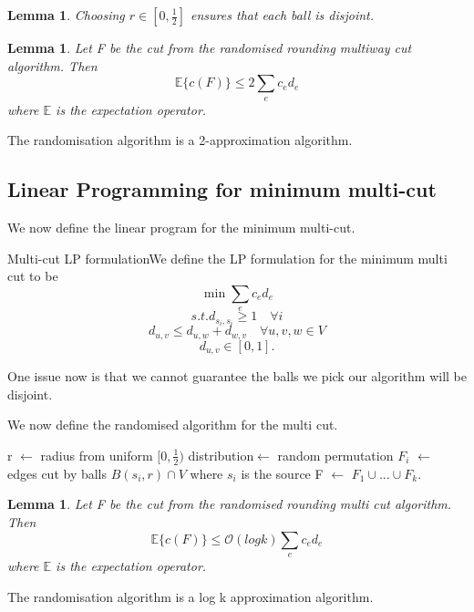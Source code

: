 \documentclass[twoside]{article}
\newtheorem{lemma}[theorem]{Lemma}
\begin{document}
\begin{lemma}Choosing $r \in [0,\frac{1}{2}]$ ensures that each ball is disjoint.
\end{lemma}

\begin{lemma}Let F be the cut from the randomised rounding multiway cut algorithm. Then 
$$
\mathbb{E}\bigg\{c(F) \bigg\} \leq 2\sum_{e}c_ed_e
$$
where $\mathbb{E}$ is the expectation operator.
\end{lemma}

The randomisation algorithm is a 2-approximation algorithm.

\subsection{Linear Programming for minimum multi-cut}
We now define the linear program for the minimum multi-cut.
\begin{theorem_exam}{Multi-cut LP formulation}{}We define the LP formulation for the minimum multi cut to be 
$$
\min \sum_{e}c_ed_e
$$
$$
s.t. d_{s_{i}, s_{i}} \geq 1 \quad \forall i
$$
$$
d_{u,v} \leq d_{u,w} + d_{w,v} \quad \forall u,v,w \in V
$$
$$
d_{u,v} \in [0,1].
$$
\end{theorem_exam}

One issue now is that we cannot guarantee the balls we pick our algorithm will be disjoint.

We now define the randomised algorithm for the multi cut.
\begin{algorithm}
\DontPrintSemicolon
{}
r $\gets$ radius from uniform $[0,\frac{1}{2})$ distribution\;
[K] $\gets$ random permutation\;
$F_i$ $\gets$ edges cut by balls $B(s_i,r) \cap V$ where $s_i$ is the source\;
F $\gets$ $F_1 \cup ... \cup F_k.$

\;
\caption{{\sc Randomised Rounding for multi cut LP}}
\label{algo:duplicate}
\end{algorithm}


\begin{lemma}Let F be the cut from the randomised rounding multi cut algorithm. Then 
$$
\mathbb{E}\bigg\{c(F) \bigg\} \leq \mathcal{O}(log k)\sum_{e}c_ed_e
$$
where $\mathbb{E}$ is the expectation operator.
\end{lemma}

The randomisation algorithm is a log k approximation algorithm.
\end{document}
